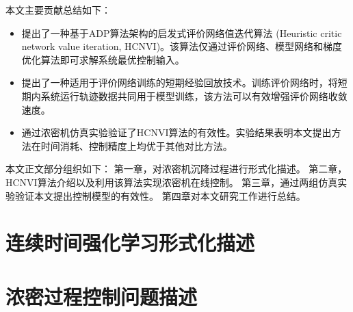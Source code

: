 
本文主要贡献总结如下：
\begin{itemize}
\item  提出了一种基于ADP算法架构的启发式评价网络值迭代算法
(Heuristic critic network value iteration,
HCNVI)。该算法仅通过评价网络、模型网络和梯度优化算法即可求解系统最优控制输入。
\item  提出了一种适用于评价网络训练的短期经验回放技术。训练评价网络时，将短期内系统运行轨迹数据共同用于模型训练，该方法可以有效增强评价网络收敛速度。
\item  通过浓密机仿真实验验证了HCNVI算法的有效性。实验结果表明本文提出方法在时间消耗、控制精度上均优于其他对比方法。
\end{itemize}

本文正文部分组织如下： 第一章，对浓密机沉降过程进行形式化描述。
第二章，HCNVI算法介绍以及利用该算法实现浓密机在线控制。
第三章，通过两组仿真实验验证本文提出控制模型的有效性。
第四章对本文研究工作进行总结。
\section{连续时间强化学习形式化描述}

\section{浓密过程控制问题描述}

